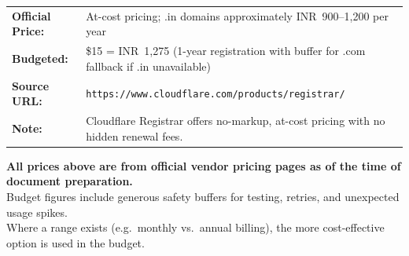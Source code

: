\documentclass[11pt, a4paper]{article}
\begin{document}
\begin{tcolorbox}[greenbox, title={Cloudflare Registrar --- Domain Registration}]
\begin{tabularx}{\linewidth}{@{}>{\bfseries}l X@{}}
Official Price:  & At-cost pricing; .in domains approximately INR~900--1,200 per year \\
Budgeted:        & \$15 = INR~1,275 (1-year registration with buffer for .com fallback if .in unavailable) \\
Source URL:      & \texttt{https://www.cloudflare.com/products/registrar/} \\
Note:            & Cloudflare Registrar offers no-markup, at-cost pricing with no hidden renewal fees. \\
\end{tabularx}
\end{tcolorbox}

\vspace{0.4cm}
\begin{tcolorbox}[highlightbox]
\centering
{\small\bfseries All prices above are from official vendor pricing pages as of the time of document preparation.}\\[0.1cm]
{\small Budget figures include generous safety buffers for testing, retries, and unexpected usage spikes.}\\[0.1cm]
{\small Where a range exists (e.g.\ monthly vs.\ annual billing), the more cost-effective option is used in the budget.}
\end{tcolorbox}
\end{document}
